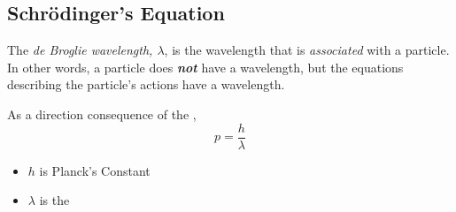 	\subsection{Schr\"{o}dinger's Equation} \label{subsec:Schrodingers Equation}
		\begin{definition} \label{def:de Broglie Wavelength}
			The \emph{de Broglie wavelength, $\lambda$}, is the wavelength that is \emph{associated} with a particle.
			In other words, a particle does \emph{\textbf{not}} have a wavelength, but the equations describing the particle's actions have a wavelength.
			\begin{note} \label{note:de Broglie Wavelength Momentum}
				As a direction consequence of the ,
				\begin{equation}
					p = \frac{h}{\lambda}
				\end{equation}
				\begin{itemize}[noitemsep, nolistsep]
					\item $h$ is Planck's Constant
					\item $\lambda$ is the 
				\end{itemize}
			\end{note}
		\end{definition}
